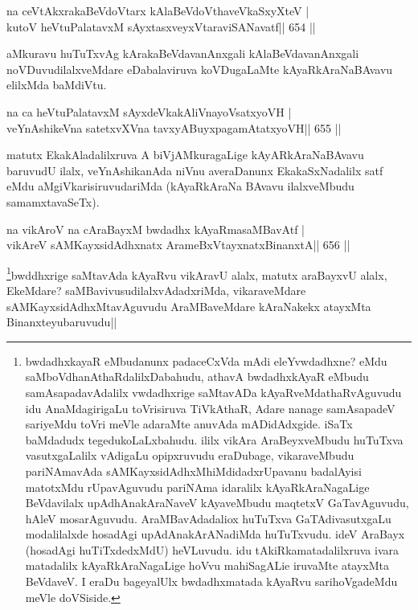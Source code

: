 \begin{shl}
na ceVtAkxrakaBeVdoV\s tarx kAlaBeVdoV\s thaveVkaSxyXteV | \\
kutoV heVtuPalatavxM sAyxtasxveyxVtaraviSANavatf\hfill ||  654 ||  
\end{shl}

\begin{artha}
aMkuravu huTuTxvAg kArakaBeVdavanAnxgali kAlaBeVdavanAnxgali noVDuvudilalxveMdare eDabalaviruva koVDugaLaMte kAyaRkAraNaBAvavu elilxMda baMdiVtu.
\end{artha}

\begin{shl}
na ca heVtuPalatavxM sAyxdeVkakAliVnayoVsatxyoVH | \\
veYnAshikeVna satetxvXVna tavxyA\s BuyxpagamAtatxyoVH\hfill ||  655 ||  
\end{shl}

\begin{artha}
matutx EkakAladalilxruva A biVjAMkuragaLige kAyARkAraNaBAvavu baruvudU ilalx, veYnAshikanAda niVnu averaDanunx EkakaSxNadalilx satf eMdu aMgiVkarisiruvudariMda (kAyaRkAraNa BAvavu ilalxveMbudu samamxtavaSeTx).
\end{artha}


\begin{shl}
na vikAroV na cA\s \s raBayxM bwdadhx kAyaRmasaMBavAtf | \\
vikAreV sAMKayxsidAdhxnatx ArameBxV\s tayxnatxBinanxtA\hfill ||  656 ||  
\end{shl}

\begin{artha}
\footnote{bwdadhxkayaR eMbudanunx padaceCxVda mAdi eleYvwdadhxne? eMdu saMboVdhanAthaRdalilxDabahudu, athavA bwdadhxkAyaR eMbudu samAsapadavAdalilx vwdadhxrige saMtavADa kAyaRveMdathaRvAguvudu idu AnaMdagirigaLu toVrisiruva TiVkAthaR, Adare nanage samAsapadeV sariyeMdu toVri meVle adaraMte anuvAda mADidAdxgide. iSaTx baMdadudx tegedukoLaLxbahudu. ililx vikAra AraBeyxveMbudu huTuTxva vasutxgaLalilx vAdigaLu opipxruvudu eraDubage, vikaraveMbudu pariNAmavAda sAMKayxsidAdhxMhiMdidadxrUpavanu badalAyisi matotxMdu rUpavAguvudu pariNAma idaralilx kAyaRkAraNagaLige BeVdavilalx upAdhAnakAraNaveV kAyaveMbudu maqtetxV GaTavAguvudu, hAleV mosarAguvudu. AraMBavAdadaliox huTuTxva GaTAdivasutxgaLu modalilalxde hosadAgi upAdAnakArANadiMda huTuTxvudu. ideV AraBayx (hosadAgi huTiTxdedxMdU) heVLuvudu. idu tAkiRkamatadalilxruva ivara matadalilx kAyaRkAraNagaLige hoVvu mahiSagALie iruvaMte atayxMta BeVdaveV. I eraDu bageyalUlx bwdadhxmatada kAyaRvu sarihoVgadeMdu meVle doVSiside.}\footnotemark bwddhxrige saMtavAda kAyaRvu vikAravU alalx, matutx araBayxvU alalx, EkeMdare? saMBavivusudilalxvAdadxriMda, vikaraveMdare sAMKayxsidAdhxMtavAguvudu AraMBaveMdare kAraNakekx atayxMta Binanxteyubaruvudu||
\end{artha}

